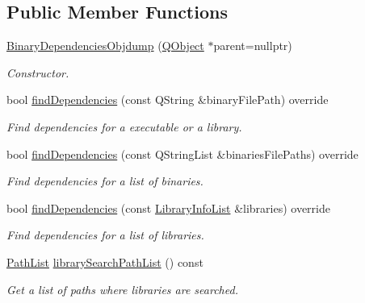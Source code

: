 \subsection*{Public Member Functions}
\begin{DoxyCompactItemize}
\item 
\hyperlink{class_mdt_1_1_deploy_utils_1_1_binary_dependencies_objdump_a3bb8d6f31156903ae1b279b3dd6e87b8}{Binary\+Dependencies\+Objdump} (\hyperlink{class_q_object}{Q\+Object} $\ast$parent=nullptr)
\begin{DoxyCompactList}\small\item\em Constructor. \end{DoxyCompactList}\item 
bool \hyperlink{class_mdt_1_1_deploy_utils_1_1_binary_dependencies_objdump_ad17be25ef296988d6255faa5c1dd573d}{find\+Dependencies} (const Q\+String \&binary\+File\+Path) override
\begin{DoxyCompactList}\small\item\em Find dependencies for a executable or a library. \end{DoxyCompactList}\item 
bool \hyperlink{class_mdt_1_1_deploy_utils_1_1_binary_dependencies_objdump_acaa13006ae7478fa5555f0d7356ae9d2}{find\+Dependencies} (const Q\+String\+List \&binaries\+File\+Paths) override
\begin{DoxyCompactList}\small\item\em Find dependencies for a list of binaries. \end{DoxyCompactList}\item 
bool \hyperlink{class_mdt_1_1_deploy_utils_1_1_binary_dependencies_objdump_ae26f2210f17cca66ba313751ae08e412}{find\+Dependencies} (const \hyperlink{class_mdt_1_1_deploy_utils_1_1_library_info_list}{Library\+Info\+List} \&libraries) override
\begin{DoxyCompactList}\small\item\em Find dependencies for a list of libraries. \end{DoxyCompactList}\item 
\hyperlink{class_mdt_1_1_deploy_utils_1_1_path_list}{Path\+List} \hyperlink{class_mdt_1_1_deploy_utils_1_1_binary_dependencies_objdump_af0ed8d25c32ae6fa1540ce43c63b1af6}{library\+Search\+Path\+List} () const 
\begin{DoxyCompactList}\small\item\em Get a list of paths where libraries are searched. \end{DoxyCompactList}\end{DoxyCompactItemize}
